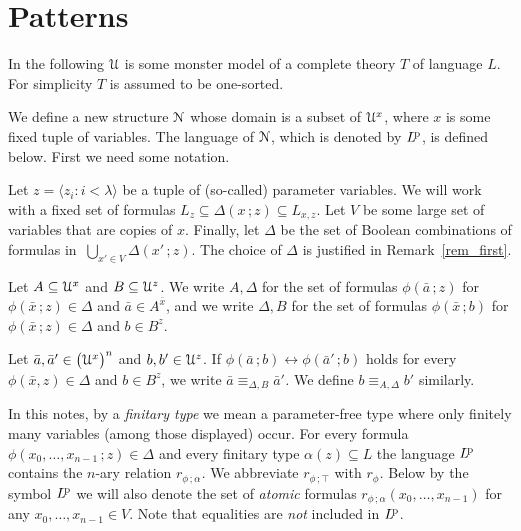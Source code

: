 \section{Patterns}
\label{patterns}

\def\ceq#1#2#3{\noindent\parbox[t]{26ex}{$\displaystyle #1$}\parbox{5ex}{\hfil $#2$}{$\displaystyle #3$}}

In the following $\EuScript U$ is some monster model of a complete theory $T$ of language $L$.
For simplicity $T$ is assumed to be one-sorted.

We define a new structure $\EuScript N$ whose domain is a subset of $\EuScript U^x$, where $x$ is some fixed tuple of variables.
The language of $\EuScript N$, which is denoted by $L^{\rm\! p}$, is defined below.
First we need some notation.

Let $z=\langle z_i:i<\lambda\rangle$ be a tuple of (so-called) parameter variables.
We will work with a fixed set of formulas $L_z\subseteq\Delta(x\,;z)\subseteq L_{x,z}$.
Let $V$ be some large set of variables that are copies of $x$.
Finally, let $\Delta$ be the set of Boolean combinations of formulas in $\ \bigcup_{x'\in V}\Delta(x'\,;z)$.
The choice of $\Delta$ is justified in Remark~\ref{rem_first}.

Let $A\subseteq\EuScript U^x$ and $B\subseteq\EuScript U^z$.
We write $A,\Delta$ for the set of formulas $\phi(\bar a\,;z)$ for $\phi(\bar x\,;z)\in\Delta$ and $\bar a\in A^{\bar x}$, and we write $\Delta,B$ for the set of formulas $\phi(\bar x\,;b)$ for $\phi(\bar x\,;z)\in\Delta$ and $b\in B^z$.

Let $\bar a,\bar a'\in\big(\EuScript U^x\big)^n$ and  $b,b'\in\EuScript U^z$.
If $\phi(\bar a\,;b)\leftrightarrow\phi(\bar a'\,;b)$ holds for every $\phi(\bar x,z)\in\Delta$ and $b\in B^z$, we write \emph{$\bar a\equiv_{\Delta,B}\bar a'$.}
We define \emph{$b\equiv_{A,\Delta}b'$} similarly.

In this notes, by a \emph{finitary type\/} we mean a parameter-free type where only finitely many variables (among those displayed) occur.
For every formula $\phi(x_0,\dots,x_{n-1}\,;z)\in\Delta$ and every finitary type $\alpha(z)\subseteq L$ the language $L^{\rm\! p}$ contains the $n$-ary relation \emph{$r_{\phi\,;\alpha}$.}
We abbreviate $r_{\phi\,;\top}$ with \emph{$r_{\phi}$.}
Below by the symbol \emph{$L^{\rm\! p}$} we will also denote the set of \textit{atomic\/} formulas $r_{\phi\,;\alpha}(x_0,\dots,x_{n-1})$ for any $x_0,\dots,x_{n-1}\in V$.
Note that equalities are \textit{not\/} included in $L^{\rm\! p}$.

